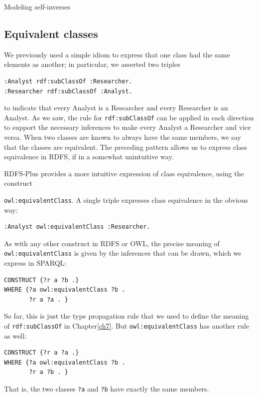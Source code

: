 \begin{challenge}{Modeling self-inverses}
\subsection{Equivalent classes}

We previously used a simple idiom to express that one class had the same
elements as another; in particular, we asserted two triples

\begin{lstlisting}
:Analyst rdf:subClassOf :Researcher.
:Researcher rdf:subClassOf :Analyst.
\end{lstlisting}

to indicate that every Analyst is a Researcher and every Researcher is
an Analyst. As we saw, the rule for \texttt{rdf:subClassOf} can be applied in
each direction to support the necessary inferences to make every Analyst
a Researcher and vice versa. When two classes are known to always have
the same members, we say that the classes are equivalent. The preceding
pattern allows us to express class equivalence in RDFS, if in a somewhat
unintuitive way.

RDFS-Plus provides a more intuitive expression of class equivalence,
using the construct

\texttt{owl:equivalentClass}. A single triple expresses class equivalence in the
obvious way:

\begin{lstlisting}
:Analyst owl:equivalentClass :Researcher.
\end{lstlisting}

As with any other construct in RDFS or OWL, the precise meaning of
\texttt{owl:equivalentClass} is given by the inferences that can be drawn, which
we express in SPARQL:

\begin{lstlisting}
CONSTRUCT {?r a ?b .}
WHERE {?a owl:equivalentClass ?b .
       ?r a ?a . }
\end{lstlisting}

So far, this is just the type propagation rule that we used to define
the meaning of \texttt{rdf:subClassOf} in Chapter\ref{ch7}. But \texttt{owl:equivalentClass} has another rule as
well:

\begin{lstlisting}
CONSTRUCT {?r a ?a .}
WHERE {?a owl:equivalentClass ?b .
       ?r a ?b . }
\end{lstlisting}

That is, the two classes \texttt{?a} and \texttt{?b} have exactly the same members.


\end{challenge}
